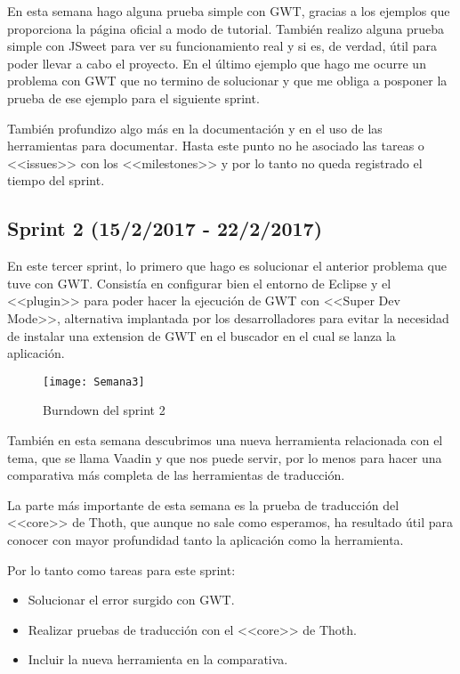 En esta semana hago alguna prueba simple con GWT, gracias a los ejemplos que proporciona la página oficial a modo de tutorial. También realizo alguna prueba simple con JSweet para ver su funcionamiento real y si es, de verdad, útil para poder llevar a cabo el proyecto. En el último ejemplo que hago me ocurre un problema con GWT que no termino de solucionar y que me obliga a posponer la prueba de ese ejemplo para el siguiente sprint.

También profundizo algo más en la documentación y en el uso de las herramientas para documentar. Hasta este punto no he asociado las tareas o <<issues>> con los <<milestones>> y por lo tanto no queda registrado el tiempo del sprint.

\subsection{Sprint 2 (15/2/2017 - 22/2/2017)}

En este tercer sprint, lo primero que hago es solucionar el anterior problema que tuve con GWT. Consistía en configurar bien el entorno de Eclipse y el <<plugin>> para poder hacer la ejecución de GWT con <<Super Dev Mode>>, alternativa implantada por los desarrolladores para evitar la necesidad de instalar una extension de GWT en el buscador en el cual se lanza la aplicación.

\begin{figure}[h]
\centering
\texttt{[image: Semana3]}
\caption{Burndown del sprint 2}
\label{fig:A.1}
\end{figure}

También en esta semana descubrimos una nueva herramienta relacionada con el tema, que se llama Vaadin y que nos puede servir, por lo menos para hacer una comparativa más completa de las herramientas de traducción. 

La parte más importante de esta semana es la prueba de traducción del <<core>> de Thoth, que aunque no sale como esperamos, ha resultado útil para conocer con mayor profundidad tanto la aplicación como la herramienta.

Por lo tanto como tareas para este sprint:

\begin{itemize}
\item Solucionar el error surgido con GWT.
\item Realizar pruebas de traducción con el <<core>> de Thoth.
\item Incluir la nueva herramienta en la comparativa.
\end{itemize}

